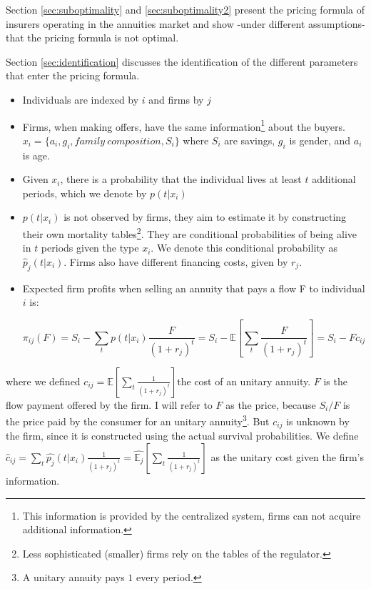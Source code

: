 \documentclass[12pt]{article}
\theoremstyle{plain}
\theoremstyle{plain}
\begin{document}
Section \ref{sec:suboptimality} and \ref{sec:suboptimality2} present the pricing formula of insurers operating in the annuities market and show -under different assumptions- that the pricing formula is not optimal. 

Section \ref{sec:identification} discusses the identification of the different parameters that enter the pricing formula.

\begin{itemize}
    \item Individuals are indexed by $i$ and firms by $j$ 
    \item Firms, when making offers, have the same information\footnote{This information is provided by the centralized system, firms can not acquire additional information.} about the buyers.\\
    $x_{i}=\{a_i,g_i,family \  composition,S_{i}\}$ where $S_{i}$ are savings, $g_i$ is gender, and $a_i$ is age. 
    \item Given $x_{i}$, there is a probability that the individual lives at least $t$ additional periods, which we denote by $p(t|x_{i})$ 
    \item $p(t|x_{i})$  is not observed by firms, they aim to estimate it by constructing their own  mortality tables\footnote{Less sophisticated (smaller) firms rely on the tables of the regulator. }. They are conditional probabilities of being alive in $t$ periods given the type $x_{i}.$ We denote this conditional probability as $\hat{p}_{j}(t|x_{i})$.
     Firms also have different financing costs, given by $r_{j}$. 

    \item Expected firm profits when selling an annuity that pays a flow F to individual $i$ is: 

\begin{equation}\label{eq:profit}
\pi_{ij}(F)=S_{i}-\sum_{t}p(t|x_{i})\frac{F}{(1+r_{j})^{t}}=S_{i}-\mathbb{E}\left[\sum_{t}\frac{F}{(1+r_{j})^{t}}\right]=S_{i}-Fc_{ij}
\end{equation}
\end{itemize}

where we defined $c_{ij}=\mathbb{E}\left[\sum_{t}\frac{1}{(1+r_{j})^{t}}\right]$the
cost of an unitary annuity. $F$ is the flow payment offered by the firm. I will refer to $F$ as the price, because
$S_{i}/F$ is the price paid by the consumer for an unitary annuity\footnote{A unitary annuity pays $1$ every period.}.
But $c_{ij}$ is unknown by the firm, since it is constructed using the
actual survival probabilities. We define $\hat{c}_{ij}=\sum_{t}\hat{p_{j}}(t|x_{i})\frac{1}{(1+r_{j})^{t}}=\hat{\mathbb{E}_{j}}\left[\sum_{t}\frac{1}{(1+r_{j})^{t}}\right]$
as the unitary cost given the firm's information.
\end{document}
